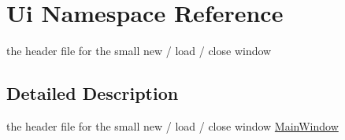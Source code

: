 \hypertarget{namespace_ui}{\section{Ui Namespace Reference}
\label{namespace_ui}
}


the header file for the small new / load / close window  




\subsection{Detailed Description}
the header file for the small new / load / close window \hyperlink{class_main_window}{Main\-Window} 